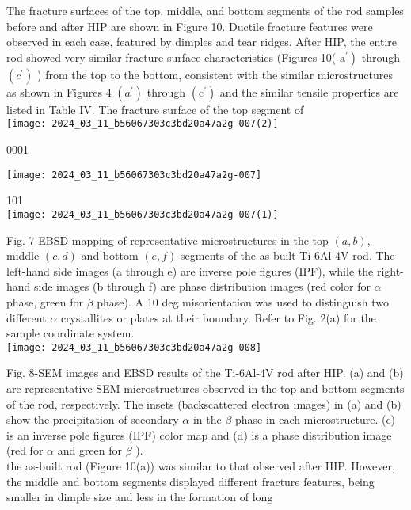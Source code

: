 \documentclass[10pt]{article}
\begin{document}
The fracture surfaces of the top, middle, and bottom segments of the rod samples before and after HIP are shown in Figure 10. Ductile fracture features were observed in each case, featured by dimples and tear ridges. After HIP, the entire rod showed very similar fracture surface characteristics (Figures 10( $\left.\mathrm{a}^{\prime}\right)$ through $\left(c^{\prime}\right)$ ) from the top to the bottom, consistent with the similar microstructures as shown in Figures 4 $\left(a^{\prime}\right)$ through $\left(\mathrm{c}^{\prime}\right)$ and the similar tensile properties are listed in Table IV. The fracture surface of the top segment of\\
\texttt{[image: 2024\_03\_11\_b56067303c3bd20a47a2g-007(2)]}

0001

\begin{center}
\texttt{[image: 2024\_03\_11\_b56067303c3bd20a47a2g-007]}
\end{center}

101\\
\texttt{[image: 2024\_03\_11\_b56067303c3bd20a47a2g-007(1)]}

Fig. 7-EBSD mapping of representative microstructures in the top $(a, b)$, middle $(c, d)$ and bottom $(e, f)$ segments of the as-built Ti-6Al-4V rod. The left-hand side images (a through e) are inverse pole figures (IPF), while the right-hand side images (b through f) are phase distribution images (red color for $\alpha$ phase, green for $\beta$ phase). A 10 deg misorientation was used to distinguish two different $\alpha$ crystallites or plates at their boundary. Refer to Fig. 2(a) for the sample coordinate system.\\
\texttt{[image: 2024\_03\_11\_b56067303c3bd20a47a2g-008]}

Fig. 8-SEM images and EBSD results of the Ti-6Al-4V rod after HIP. (a) and (b) are representative SEM microstructures observed in the top and bottom segments of the rod, respectively. The insets (backscattered electron images) in (a) and (b) show the precipitation of secondary $\alpha$ in the $\beta$ phase in each microstructure. (c) is an inverse pole figures (IPF) color map and (d) is a phase distribution image (red for $\alpha$ and green for $\beta$ ).\\
the as-built rod (Figure 10(a)) was similar to that observed after HIP. However, the middle and bottom segments displayed different fracture features, being smaller in dimple size and less in the formation of long
\end{document}
